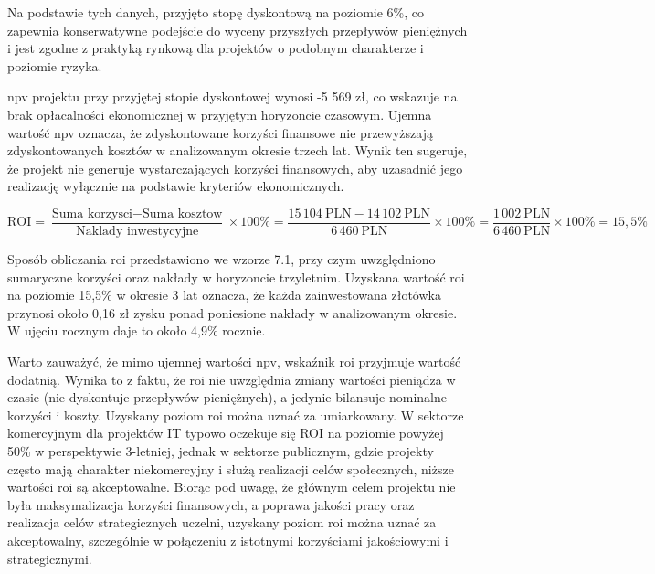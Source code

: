 Na podstawie tych danych, przyjęto stopę dyskontową na poziomie 6\%, co zapewnia konserwatywne podejście do wyceny przyszłych przepływów pieniężnych i jest zgodne z praktyką rynkową dla projektów o podobnym charakterze i poziomie ryzyka.

\gls{npv} projektu przy przyjętej stopie dyskontowej wynosi -5 569 zł, co wskazuje na brak opłacalności ekonomicznej w przyjętym horyzoncie czasowym. Ujemna wartość \gls{npv} oznacza, że zdyskontowane korzyści finansowe nie przewyższają zdyskontowanych kosztów w analizowanym okresie trzech lat. Wynik ten sugeruje, że projekt nie generuje wystarczających korzyści finansowych, aby uzasadnić jego realizację wyłącznie na podstawie kryteriów ekonomicznych.

{ \footnotesize
\begin{equation}\label{eq:Return on Investment}
\text{ROI} = \frac{\text{Suma korzysci} - \text{Suma kosztow}}{\text{Naklady inwestycyjne}} \times 100\% = \frac{15\,104\ \text{PLN} - 14\,102\ \text{PLN}}{6\,460\ \text{PLN}} \times 100\% = \frac{1\,002\ \text{PLN}}{6\,460\ \text{PLN}} \times 100\% = 15{,}5\%
\end{equation}
}

Sposób obliczania \gls{roi} przedstawiono we wzorze 7.1, przy czym uwzględniono sumaryczne korzyści oraz nakłady w horyzoncie trzyletnim. Uzyskana wartość \gls{roi} na poziomie 15,5\% w okresie 3 lat oznacza, że każda zainwestowana złotówka przynosi około 0,16 zł zysku ponad poniesione nakłady w analizowanym okresie. W ujęciu rocznym daje to około 4,9\% rocznie.

Warto zauważyć, że mimo ujemnej wartości \gls{npv}, wskaźnik \gls{roi} przyjmuje wartość dodatnią. Wynika to z faktu, że \gls{roi} nie uwzględnia zmiany wartości pieniądza w czasie (nie dyskontuje przepływów pieniężnych), a jedynie bilansuje nominalne korzyści i koszty.
Uzyskany poziom \gls{roi} można uznać za umiarkowany. W sektorze komercyjnym dla projektów IT typowo oczekuje się ROI na poziomie powyżej 50\% w perspektywie 3-letniej, jednak w sektorze publicznym, gdzie projekty często mają charakter niekomercyjny i służą realizacji celów społecznych, niższe wartości \gls{roi} są akceptowalne.
Biorąc pod uwagę, że głównym celem projektu nie była maksymalizacja korzyści finansowych, a poprawa jakości pracy oraz realizacja celów strategicznych uczelni, uzyskany poziom \gls{roi} można uznać za akceptowalny, szczególnie w połączeniu z istotnymi korzyściami jakościowymi i strategicznymi.

